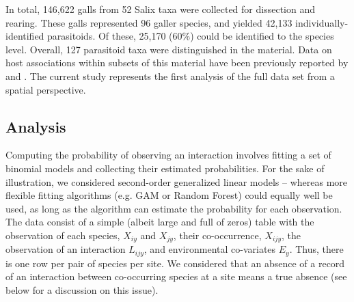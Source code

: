 \documentclass[12pt]{article}
\begin{document}
In total, 146,622 galls from 52 Salix taxa were collected for dissection and
rearing. These galls represented 96 galler species, and yielded 42,133
individually-identified parasitoids. Of these, 25,170 (60\%) could be
identified to the species level. Overall, 127 parasitoid taxa were
distinguished in the material. Data on host associations within subsets of
this material have been previously reported by \citep{Kopelke1999} and
\citep{Nyman2007}. The current study represents the first analysis of
the full data set from a spatial perspective.

\subsection*{Analysis}  

Computing the probability of observing an interaction involves fitting a set
of binomial models and collecting their estimated probabilities. For the sake
of illustration, we considered second-order generalized linear models –
whereas more flexible fitting algorithms (e.g. GAM or Random Forest)
could equally well be used, as long as the algorithm can estimate the
probability for each observation. The data consist of a simple (albeit large
and full of zeros) table with the observation of each species, $X_{iy}$ and $X_{jy}$,
their co-occurrence, $X_{ijy}$, the observation of an interaction $L_{ijy}$, and
environmental co-variates $E_y$. Thus, there is one row per pair of species per
site. We considered that an absence of a record of an interaction between co-occurring
species at a site means a true absence (see below for a discussion
on this issue).
\end{document}
